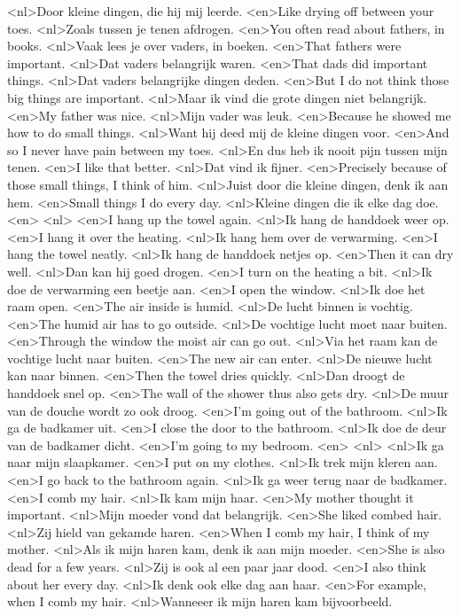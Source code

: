 <nl>Door kleine dingen, die hij mij leerde.
<en>Like drying off between your toes.
<nl>Zoals tussen je tenen afdrogen.
<en>You often read about fathers, in books.
<nl>Vaak lees je over vaders, in boeken.
<en>That fathers were important.
<nl>Dat vaders belangrijk waren.
<en>That dads did important things.
<nl>Dat vaders belangrijke dingen deden.
<en>But I do not think those big things are important.
<nl>Maar ik vind die grote dingen niet belangrijk.
<en>My father was nice.
<nl>Mijn vader was leuk.
<en>Because he showed  me how to do small things.
<nl>Want hij deed mij de kleine dingen voor.
<en>And so I never have pain between my toes.
<nl>En dus heb ik nooit pijn tussen mijn tenen.
<en>I like that better.
<nl>Dat vind ik fijner.
<en>Precisely because of those small things, I think of him.
<nl>Juist door die kleine dingen, denk ik aan hem.
<en>Small things I do every day.
<nl>Kleine dingen die ik elke dag doe.
<en>
<nl>
<en>I hang up the towel again.
<nl>Ik hang de handdoek weer op.
<en>I hang it over the heating.
<nl>Ik hang hem over de verwarming.
<en>I hang the towel neatly.
<nl>Ik hang de handdoek netjes op.
<en>Then it can dry well.
<nl>Dan kan hij goed drogen.
<en>I turn on the heating a bit.
<nl>Ik doe de verwarming een beetje aan.
<en>I open the window.
<nl>Ik doe het raam open.
<en>The air inside is humid.
<nl>De lucht binnen is vochtig.
<en>The humid air has to go outside.
<nl>De vochtige lucht moet naar buiten.
<en>Through the window the moist air can go out.
<nl>Via het raam kan de vochtige lucht naar buiten.
<en>The new air can enter.
<nl>De nieuwe lucht kan naar binnen.
<en>Then the towel dries quickly.
<nl>Dan droogt de handdoek snel op.
<en>The wall of the shower  thus also gets dry.
<nl>De muur van de douche wordt zo ook droog.
<en>I'm going out of the bathroom.
<nl>Ik ga de badkamer uit.
<en>I close the door to the bathroom.
<nl>Ik doe de deur van de badkamer dicht.
<en>I'm going to my bedroom.
<en>
<nl>
<nl>Ik ga naar mijn slaapkamer.
<en>I put on my clothes.
<nl>Ik trek mijn kleren aan.
<en>I go back to the bathroom again.
<nl>Ik ga weer terug naar de badkamer.
<en>I comb my hair.
<nl>Ik kam mijn haar.
<en>My mother thought it important.
<nl>Mijn moeder vond dat belangrijk.
<en>She liked combed hair.
<nl>Zij hield van gekamde haren.
<en>When I comb my hair, I think of my mother.
<nl>Als ik mijn haren kam, denk ik aan mijn moeder.
<en>She is also dead for a few years.
<nl>Zij is ook al een paar jaar dood.
<en>I also think about her every day.
<nl>Ik denk ook elke dag aan haar.
<en>For example, when I comb my hair.
<nl>Wanneeer ik mijn haren kam bijvoorbeeld.
